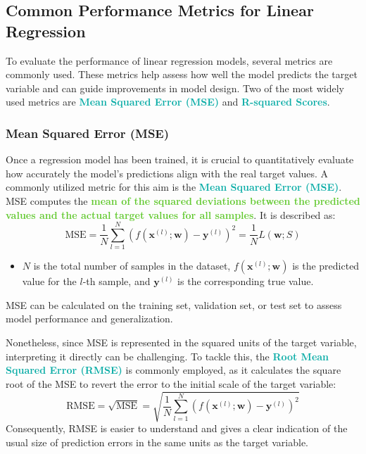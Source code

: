 \documentclass[twoside]{article}
\newcommand{\highlightbluetext}[1]{\textcolor[HTML]{09ACA6}{\textbf{#1}}}
\newcommand{\highlightgreentext}[1]{\textcolor[HTML]{62C92F}{\textbf{#1}}}
\numberwithin{equation}{section}
\begin{document}
	\subsection{Common Performance Metrics for Linear Regression}
	\label{subsec:CommonPerformanceMetricsForLinearRegression}
	To evaluate the performance of linear regression models, several metrics are commonly used. These metrics help assess how well the model predicts the target variable and can guide improvements in model design. Two of the most widely used metrics are \highlightbluetext{Mean Squared Error (MSE)} and \highlightbluetext{R-squared Scores}.

	\subsubsection{Mean Squared Error (MSE)}
	\label{subsubsec:MeanSquaredError}
	Once a regression model has been trained, it is crucial to quantitatively evaluate how accurately the model's predictions align with the real target values. A commonly utilized metric for this aim is the \highlightbluetext{Mean Squared Error (MSE)}. MSE computes the \highlightgreentext{mean of the squared deviations between the predicted values and the actual target values for all samples}. It is described as:
	\begin{equation}
	\label{eq:MeanSquaredErrorDefinition}
		\boxed{\text{MSE} = \frac{1}{N} \sum_{l = 1}^{N} \left( f(\mathbf{x}^{(l)}; \mathbf{w}) - \mathbf{y}^{(l)} \right)^2 = \frac{1}{N} L(\mathbf{w}; S)}
	\end{equation}
	\begin{itemize}
		\item $N$ is the total number of samples in the dataset, $f(\mathbf{x}^{(l)}; \mathbf{w})$ is the predicted value for the $l$-th sample, and $\mathbf{y}^{(l)}$ is the corresponding true value.
	\end{itemize}
	MSE can be calculated on the training set, validation set, or test set to assess model performance and generalization.

	Nonetheless, since MSE is represented in the squared units of the target variable, interpreting it directly can be challenging. To tackle this, the \highlightbluetext{Root Mean Squared Error (RMSE)} is commonly employed, as it calculates the square root of the MSE to revert the error to the initial scale of the target variable:
	\begin{equation}
	\label{eq:RootMeanSquaredErrorDefinition}
		\boxed{\text{RMSE} = \sqrt{\text{MSE}} = \sqrt{\frac{1}{N} \sum_{l = 1}^{N} \left( f(\mathbf{x}^{(l)}; \mathbf{w}) - \mathbf{y}^{(l)} \right)^2}}
	\end{equation}
	Consequently, RMSE is easier to understand and gives a clear indication of the usual size of prediction errors in the same units as the target variable.
\end{document}
